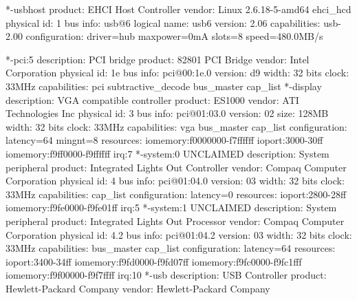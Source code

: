 \documentclass[mingoth,a4paper]{jsarticle}
\begin{document}
{{{{{{{{{{{{{{{{{{\begin{commandline}
           *-usbhost
                product: EHCI Host Controller
                vendor: Linux 2.6.18-5-amd64 ehci_hcd
                physical id: 1
                bus info: usb@6
                logical name: usb6
                version: 2.06
                capabilities: usb-2.00
                configuration: driver=hub maxpower=0mA slots=8 speed=480.0MB/s
\end{commandline}
\begin{commandline}
        *-pci:5
             description: PCI bridge
             product: 82801 PCI Bridge
             vendor: Intel Corporation
             physical id: 1e
             bus info: pci@00:1e.0
             version: d9
             width: 32 bits
             clock: 33MHz
             capabilities: pci subtractive_decode bus_master cap_list
           *-display
                description: VGA compatible controller
                product: ES1000
                vendor: ATI Technologies Inc
                physical id: 3
                bus info: pci@01:03.0
                version: 02
                size: 128MB
                width: 32 bits
                clock: 33MHz
                capabilities: vga bus_master cap_list
                configuration: latency=64 mingnt=8
                resources: iomemory:f0000000-f7ffffff ioport:3000-30ff iomemory:f9ff0000-f9ffffff irq:7
           *-system:0 UNCLAIMED
                description: System peripheral
                product: Integrated Lights Out Controller
                vendor: Compaq Computer Corporation
                physical id: 4
                bus info: pci@01:04.0
                version: 03
                width: 32 bits
                clock: 33MHz
                capabilities: cap_list
                configuration: latency=0
                resources: ioport:2800-28ff iomemory:f9fe0000-f9fe01ff irq:5
           *-system:1 UNCLAIMED
                description: System peripheral
                product: Integrated Lights Out  Processor
                vendor: Compaq Computer Corporation
                physical id: 4.2
                bus info: pci@01:04.2
                version: 03
                width: 32 bits
                clock: 33MHz
                capabilities: bus_master cap_list
                configuration: latency=64
                resources: ioport:3400-34ff iomemory:f9fd0000-f9fd07ff iomemory:f9fc0000-f9fc1fff iomemory:f9f00000-f9f7ffff irq:10
           *-usb
                description: USB Controller
                product: Hewlett-Packard Company
                vendor: Hewlett-Packard Company

\end{commandline}}}}}}}}}}}}}}}}}}}
\end{document}
